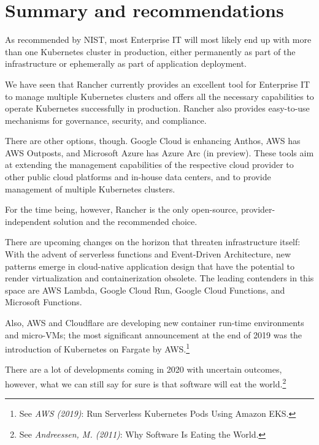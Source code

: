 %
%

\pagebreak
\section{Summary and recommendations}

\onehalfspacing

As recommended by NIST, most Enterprise IT will most likely end up with more than one Kubernetes cluster in production, either permanently as part of the infrastructure or ephemerally as part of application deployment.

We have seen that Rancher currently provides an excellent tool for Enterprise IT to manage multiple Kubernetes clusters and offers all the necessary capabilities to operate Kubernetes successfully in production. Rancher also provides easy-to-use mechanisms for governance, security, and compliance.

There are other options, though. Google Cloud is enhancing Anthos, AWS has AWS Outposts, and Microsoft Azure has Azure Arc (in preview). These tools aim at extending the management capabilities of the respective cloud provider to other public cloud platforms and in-house data centers, and to provide management of multiple Kubernetes clusters.

For the time being, however, Rancher is the only open-source, provider-independent solution and the recommended choice.

There are upcoming changes on the horizon that threaten infrastructure itself: With the advent of serverless functions and Event-Driven Architecture, new patterns emerge in cloud-native application design that have the potential to render virtualization and containerization obsolete. The leading contenders in this space are AWS Lambda, Google Cloud Run, Google Cloud Functions, and Microsoft Functions.

Also, AWS and Cloudflare are developing new container run-time environments and micro-VMs; the most significant announcement at the end of 2019 was the introduction of Kubernetes on Fargate by AWS.\footnote{See \textit{AWS (2019)}: Run Serverless Kubernetes Pods Using Amazon EKS.\cite{eksFargate}}

There are a lot of developments coming in 2020 with uncertain outcomes, however, what we can still say for sure is that software will eat the world.\footnote{See \textit{Andreessen, M. (2011)}: Why Software Is Eating the World.\cite{softwareEats}}

